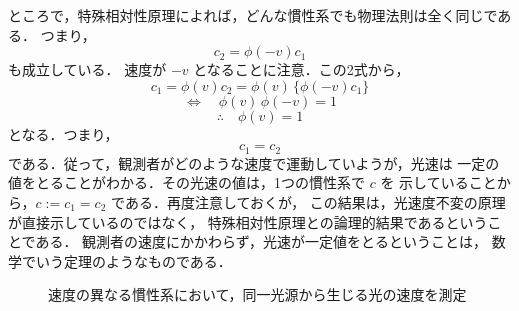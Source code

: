             ところで，特殊相対性原理によれば，どんな慣性系でも物理法則は全く同じである．
            つまり，
                \begin{equation*}
                    c_{2}=\phi(-v)  c_{1}
                \end{equation*}
            も成立している．  速度が $-v$ となることに注意．この2式から，
                \begin{equation*}
                    c_{1}=\phi(v)  c_{2}=\phi(v) \, \{\phi(-v)  c_{1} \}
                \end{equation*}
                \begin{equation*}
                    \Leftrightarrow \quad \phi(v) \, \phi(-v)  = 1
                \end{equation*}
                \begin{equation*}
                    \therefore \quad \phi(v)  =1
                \end{equation*}
            となる．つまり，
                \begin{equation*}
                    c_{1}=c_{2}
                \end{equation*}
            である．従って，観測者がどのような速度で運動していようが，光速は
            一定の値をとることがわかる．その光速の値は，1つの慣性系で $c$ を
            示していることから，$c:= c_{1}=c_{2}$ である．再度注意しておくが，
            この結果は，光速度不変の原理が直接示しているのではなく，
            特殊相対性原理との論理的結果であるということである．
            観測者の速度にかかわらず，光速が一定値をとるということは，
            数学でいう定理のようなものである．
            \begin{figure}[hbt]
                \begin{center}
                    \caption{速度の異なる慣性系において，同一光源から生じる光の速度を測定}
                    \label{fig:RT_kousoku_ittti}
                \end{center}
            \end{figure}
